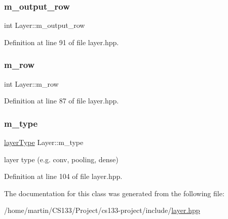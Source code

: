 \mbox{\label{class_layer_ad9382e1b855f564939e1bfe019cf1ef1}} 
\subsubsection{\texorpdfstring{m\+\_\+output\+\_\+row}{m\_output\_row}}
{\footnotesize\ttfamily int Layer\+::m\+\_\+output\+\_\+row\hspace{0.3cm}{\ttfamily [protected]}}



Definition at line 91 of file layer.\+hpp.

\mbox{\label{class_layer_a2faa0c9318f06ceda4505cbd4671f00e}} 
\subsubsection{\texorpdfstring{m\+\_\+row}{m\_row}}
{\footnotesize\ttfamily int Layer\+::m\+\_\+row\hspace{0.3cm}{\ttfamily [protected]}}



Definition at line 87 of file layer.\+hpp.

\mbox{\label{class_layer_a516bc8d3e48f4a1509ff1c680c3ddeb5}} 
\subsubsection{\texorpdfstring{m\+\_\+type}{m\_type}}
{\footnotesize\ttfamily \hyperlink{class_layer_a823f18343920cda4f52dce36df6e851f}{layer\+Type} Layer\+::m\+\_\+type\hspace{0.3cm}{\ttfamily [protected]}}



layer type (e.\+g. conv, pooling, dense) 



Definition at line 104 of file layer.\+hpp.



The documentation for this class was generated from the following file\+:\begin{DoxyCompactItemize}
\item 
/home/martin/\+C\+S133/\+Project/cs133-\/project/include/\hyperlink{_layer_8hpp}{layer.\+hpp}\end{DoxyCompactItemize}
